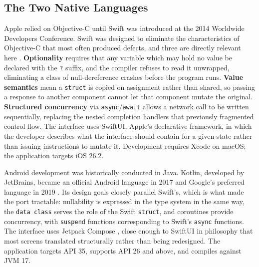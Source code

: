 \subsection{The Two Native Languages}

Apple relied on Objective-C until Swift was introduced at the 2014 Worldwide Developers
Conference. Swift was designed to eliminate the characteristics of Objective-C that most often
produced defects, and three are directly relevant here \cite{swiftbook}. \textbf{Optionality}
requires that any variable which may hold no value be declared with the \texttt{?} suffix, and
the compiler refuses to read it unwrapped, eliminating a class of null-dereference crashes
before the program runs. \textbf{Value semantics} mean a \texttt{struct} is copied on
assignment rather than shared, so passing a response to another component cannot let that
component mutate the original. \textbf{Structured concurrency} via \texttt{async}/\texttt{await}
allows a network call to be written sequentially, replacing the nested completion handlers that
previously fragmented control flow. The interface uses SwiftUI, Apple's declarative framework,
in which the developer describes what the interface should contain for a given state rather
than issuing instructions to mutate it. Development requires Xcode on macOS; the application
targets iOS 26.2.

Android development was historically conducted in Java. Kotlin, developed by JetBrains, became
an official Android language in 2017 and Google's preferred language in 2019 \cite{kotlin}. Its
design goals closely parallel Swift's, which is what made the port tractable: nullability is
expressed in the type system in the same way, the \texttt{data class} serves the role of the
Swift \texttt{struct}, and coroutines provide concurrency, with \texttt{suspend} functions
corresponding to Swift's \texttt{async} functions. The interface uses Jetpack Compose
\cite{compose}, close enough to SwiftUI in philosophy that most screens translated structurally
rather than being redesigned. The application targets API 35, supports API 26 and above, and
compiles against JVM 17.

